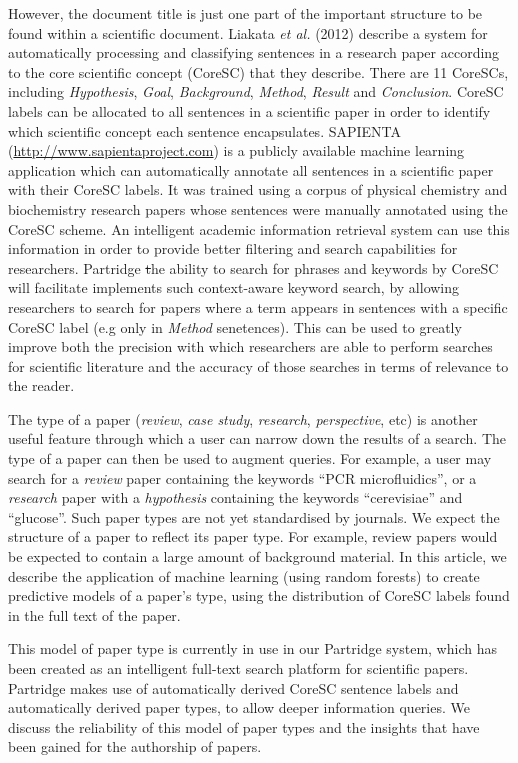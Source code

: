 \documentclass{svmult}
\begin{document}
However, the document title is just one part of the important structure to be
found within a scientific document.  Liakata \emph{et al.} (2012) describe a
system for automatically processing and classifying sentences in a research
paper according to the core scientific concept (CoreSC) that they
describe\cite{Liakata2012}.  There are 11 CoreSCs, including {\em Hypothesis}, {\em Goal},
{\it Background}, {\em Method}, {\em Result} and {\em Conclusion}.  CoreSC
labels can be allocated to all sentences in a scientific paper in order to
identify which scientific concept each sentence encapsulates.  SAPIENTA
(\url{http://www.sapientaproject.com}) is a publicly available machine learning application which
can automatically annotate all sentences in a scientific paper with their
CoreSC labels. It was trained using a corpus of physical chemistry and
biochemistry research papers whose sentences were manually annotated using the
CoreSC\cite{LIAKATA10.644} scheme.  An intelligent academic information
retrieval system can use this information in order to provide better filtering
and search capabilities for researchers.  Partridge {\st the ability to search for phrases and
keywords by CoreSC will facilitate} implements such context-aware keyword search, by allowing
researchers to search for papers where a term appears in sentences with a
specific CoreSC label (e.g only in {\em Method} senetences). This can be used to greatly improve both the precision
with which researchers are able to perform searches for scientific literature
and the accuracy of those searches in terms of relevance to the reader.

The type of a paper ({\em review}, {\em case study}, {\em research}, {\em
perspective}, etc) is another useful feature through which a user can narrow
down the results of a search.  The type of a paper can then be used to augment
queries.  For example, a user may search for a {\em review} paper containing
the keywords ``PCR microfluidics'', or a {\em research} paper with a {\em
hypothesis} containing the keywords ``cerevisiae'' and ``glucose''.   Such
paper types are not yet standardised by journals.  We expect the structure of a
paper to reflect its paper type.  For example, review papers would be expected
to contain a large amount of background material.  In this article, we describe
the application of machine learning (using random forests) to create predictive
models of a paper's type, using the distribution of CoreSC labels found in the
full text of the paper. 

This model of paper type is currently in use in our Partridge system, which has
been created as an intelligent full-text search platform for scientific papers.
Partridge makes use of automatically derived CoreSC sentence labels and
automatically derived paper types, to allow deeper information queries.  We
discuss the reliability of this model of paper types and the insights that have
been gained for the authorship of papers.
\end{document}

